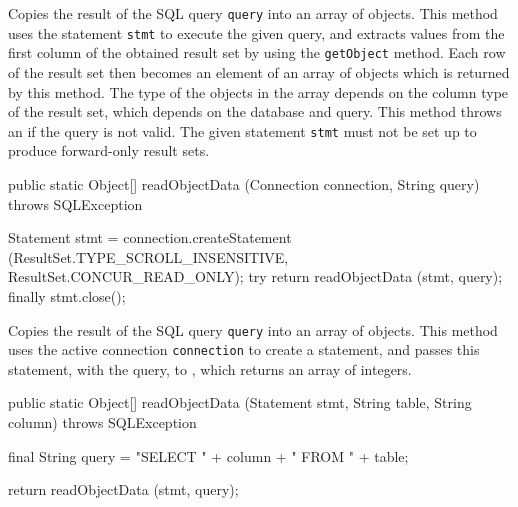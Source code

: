 \begin{tabb}
   Copies the result of the SQL query \texttt{query} into an array of objects.
   This method uses the statement \texttt{stmt} to execute the given query, and
   extracts values from the first column of the obtained result set by
   using the \texttt{getObject} method.
   Each row of the result set then becomes an element of an array of objects
    which is returned by this method.
    The type of the objects in the array depends on the column type of
    the result set, which depends on the database and query.
    This method throws an  if the query is not valid.
   The given statement \texttt{stmt} must not be set up to
   produce forward-only result sets.
\end{tabb}
\begin{htmlonly}
\end{htmlonly}
\begin{code}

   public static Object[] readObjectData (Connection connection,
                                          String query)
            throws SQLException\begin{hide} {
      Statement stmt = connection.createStatement
      (ResultSet.TYPE_SCROLL_INSENSITIVE, ResultSet.CONCUR_READ_ONLY);
      try {
         return readObjectData (stmt, query);
      }
      finally {
         stmt.close();
      }
   }\end{hide}
\end{code}
\begin{tabb}
   Copies the result of the SQL query \texttt{query} into an array of objects.
   This method uses the active connection \texttt{connection} to create
   a statement, and passes this statement, with the query, to
   , which returns an
   array of integers.
\end{tabb}
\begin{htmlonly}
\end{htmlonly}
\begin{code}

   public static Object[] readObjectData (Statement stmt,
                                          String table, String column)
            throws SQLException\begin{hide} {
        final String query = "SELECT " + column + " FROM " + table;
        
        return readObjectData (stmt, query);
    }\end{hide}
\end{code}
